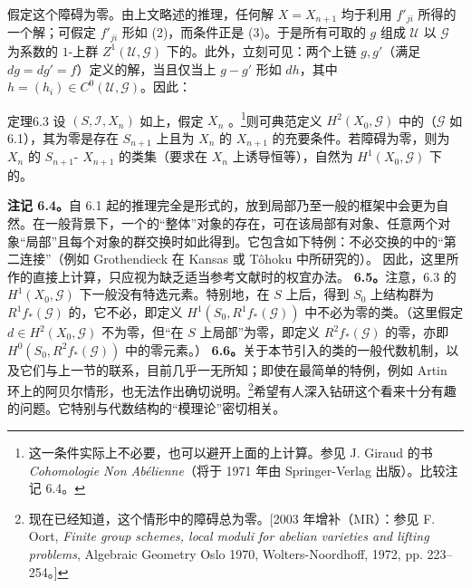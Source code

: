 假定这个障碍为零。由上文略述的推理，任何解 $X=X_{n+1}$ 均于利用 $f'_{ji}$ 所得的一个解；可假定 $f'_{ji}$ 形如 (2)，而条件正是 (3)。于是所有可取的 $g$ 组成 $\mathcal U$ 以 $\mathcal G$ 为系数的 $1$-上群 $Z^1(\mathcal U,\mathcal G)$ 下的。此外，立刻可见：两个上链 $g,g'$（满足 $dg=dg'=f$）定义的解，当且仅当上 $g-g'$ 形如 $dh$，其中 $h=(h_i)\in C^0(\mathcal U,\mathcal G)$。因此：
\begin{SGAresult}{定理}{6.3}
设 $(S,\mathcal I,X_n)$ 如上，假定 $X_n$ 。\footnote{这一条件实际上不必要，也可以避开上面的上计算。参见 J. Giraud 的书 \emph{Cohomologie Non Abélienne}（将于 1971 年由 Springer-Verlag 出版）。比较注记 6.4。}则可典范定义 $H^2(X_0,\mathcal G)$ 中的（$\mathcal G$ 如 6.1），其为零是存在 $S_{n+1}$ 上且为 $X_n$ 的 $X_{n+1}$ 的充要条件。若障碍为零，则为 $X_n$ 的 $S_{n+1}$- $X_{n+1}$ 的类集（要求在 $X_n$ 上诱导恒等），自然为 $H^1(X_0,\mathcal G)$ 下的。
\end{SGAresult}
\textbf{注记 6.4。}自 6.1 起的推理完全是形式的，放到局部乃至一般的框架中会更为自然。在一般背景下，一个的“整体”对象的存在，可在该局部有对象、任意两个对象“局部”且每个对象的群交换时如此得到。它包含如下特例：不必交换的中的“第二连接”（例如 Grothendieck 在 Kansas 或 Tôhoku 中所研究的）。
因此，这里所作的直接上计算，只应视为缺乏适当参考文献时的权宜办法。
\textbf{6.5。}注意，6.3 的 $H^1(X_0,\mathcal G)$ 下一般没有特选元素。特别地，在 $S$ 上后，得到 $S_0$ 上结构群为 $R^1f_*(\mathcal G)$ 的，它不必，即定义 $H^1(S_0,R^1f_*(\mathcal G))$ 中不必为零的类。（这里假定 $d\in H^2(X_0,\mathcal G)$ 不为零，但“在 $S$ 上局部”为零，即定义 $R^2f_*(\mathcal G)$ 的零，亦即 $H^0(S_0,R^2f_*(\mathcal G))$ 中的零元素。）
\textbf{6.6。}关于本节引入的类的一般代数机制，以及它们与上一节的联系，目前几乎一无所知；即使在最简单的特例，例如 Artin 环上的阿贝尔情形，也无法作出确切说明。\footnote{现在已经知道，这个情形中的障碍总为零。[2003 年增补（MR）：参见 F. Oort, \emph{Finite group schemes, local moduli for abelian varieties and lifting problems}, Algebraic Geometry Oslo 1970, Wolters-Noordhoff, 1972, pp. 223--254。]}希望有人深入钻研这个看来十分有趣的问题。它特别与代数结构的“模理论”密切相关。
